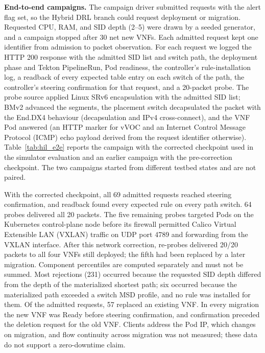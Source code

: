 \documentclass[final,5p]{elsarticle}
\newcommand{\rev}[1]{\textcolor{revisiongreen}{#1}}
\let\newrev\rev
\newcommand{\HILEtoESteered}{69}
\newcommand{\HILEtoEFullProbes}{64}
\newcommand{\HILEtoEMigrations}{57}
\begin{document}


\newrev{\textbf{End-to-end campaigns.} The campaign driver submitted requests with the alert flag set, so the Hybrid DRL branch could request deployment or migration. Requested CPU, RAM, and SID depth (2--5) were drawn by a seeded generator, and a campaign stopped after 30 net new VNFs. Each admitted request kept one identifier from admission to packet observation. For each request we logged the HTTP 200 response with the admitted SID list and switch path, the deployment phase and Tekton PipelineRun, Pod readiness, the controller's rule-installation log, a readback of every expected table entry on each switch of the path, the controller's steering confirmation for that request, and a 20-packet probe. The probe source applied Linux SRv6 encapsulation with the admitted SID list; BMv2 advanced the segments, the placement switch decapsulated the packet with the End.DX4 behaviour (decapsulation and IPv4 cross-connect), and the VNF Pod answered (an HTTP marker for vVOC and an Internet Control Message Protocol (ICMP) echo payload derived from the request identifier otherwise). Table~\ref{tab:hil_e2e} reports the campaign with the corrected checkpoint used in the simulator evaluation and an earlier campaign with the pre-correction checkpoint. The two campaigns started from different testbed states and are not paired.}

\newrev{With the corrected checkpoint, all \HILEtoESteered{} admitted requests reached steering confirmation, and readback found every expected rule on every path switch. \HILEtoEFullProbes{} probes delivered all 20 packets. The five remaining probes targeted Pods on the Kubernetes control-plane node before its firewall permitted Calico Virtual Extensible LAN (VXLAN) traffic on UDP port 4789 and forwarding from the VXLAN interface. After this network correction, re-probes delivered 20/20 packets to all four VNFs still deployed; the fifth had been replaced by a later migration. Component percentiles are computed separately and must not be summed. Most rejections (231) occurred because the requested SID depth differed from the depth of the materialized shortest path; six occurred because the materialized path exceeded a switch MSD profile, and no rule was installed for them. Of the admitted requests, \HILEtoEMigrations{} replaced an existing VNF. In every migration the new VNF was Ready before steering confirmation, and confirmation preceded the deletion request for the old VNF. Clients address the Pod IP, which changes on migration, and flow continuity across migration was not measured; these data do not support a zero-downtime claim.}
\end{document}
